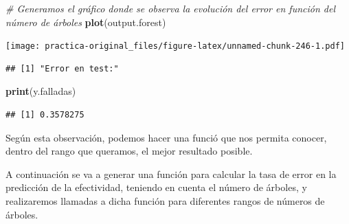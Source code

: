 \documentclass[spanish,]{article}
\newenvironment{Shaded}{\begin{snugshade}}{\end{snugshade}}
\newcommand{\KeywordTok}[1]{\textcolor[rgb]{0.13,0.29,0.53}{\textbf{#1}}}
\newcommand{\DataTypeTok}[1]{\textcolor[rgb]{0.13,0.29,0.53}{#1}}
\newcommand{\DecValTok}[1]{\textcolor[rgb]{0.00,0.00,0.81}{#1}}
\newcommand{\StringTok}[1]{\textcolor[rgb]{0.31,0.60,0.02}{#1}}
\newcommand{\CommentTok}[1]{\textcolor[rgb]{0.56,0.35,0.01}{\textit{#1}}}
\newcommand{\OperatorTok}[1]{\textcolor[rgb]{0.81,0.36,0.00}{\textbf{#1}}}
\newcommand{\NormalTok}[1]{#1}
\begin{document}
\begin{Shaded}
\begin{Highlighting}[]
\CommentTok{# Generamos el gráfico donde se observa la evolución del error en función del número de árboles}
\KeywordTok{plot}\NormalTok{(output.forest)}
\end{Highlighting}
\end{Shaded}

\texttt{[image: practica-original\_files/figure-latex/unnamed-chunk-246-1.pdf]}

\begin{Shaded}
\end{Shaded}

\begin{verbatim}
## [1] "Error en test:"
\end{verbatim}

\begin{Shaded}
\begin{Highlighting}[]
\KeywordTok{print}\NormalTok{(y.falladas)}
\end{Highlighting}
\end{Shaded}

\begin{verbatim}
## [1] 0.3578275
\end{verbatim}

Según esta observación, podemos hacer una funció que nos permita
conocer, dentro del rango que queramos, el mejor resultado posible.

A continuación se va a generar una función para calcular la tasa de
error en la predicción de la efectividad, teniendo en cuenta el número
de árboles, y realizaremos llamadas a dicha función para diferentes
rangos de números de árboles.
\end{document}
